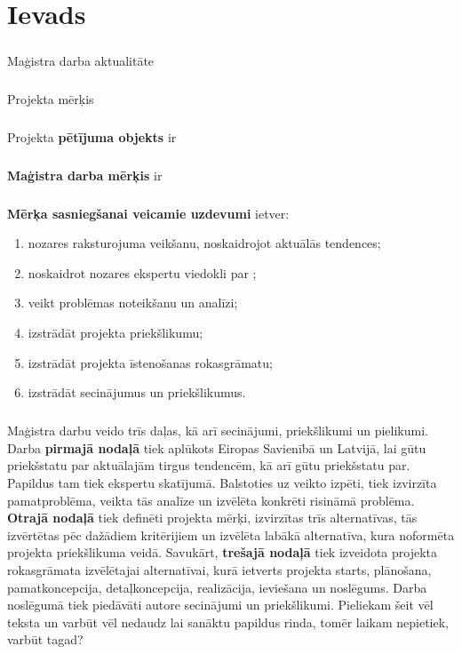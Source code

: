 \chapter*{Ievads} %
\paragraph{}
Maģistra darba aktualitāte
\paragraph{}
Projekta mērķis
\paragraph{}
Projekta \textbf{pētījuma objekts} ir 
\paragraph{}
\textbf{Maģistra darba mērķis} ir 
\paragraph{}
\textbf{Mērķa sasniegšanai veicamie uzdevumi} ietver:
\begin{enumerate}
    \item nozares raksturojuma veikšanu, noskaidrojot aktuālās tendences;
    \item noskaidrot nozares ekspertu viedokli par ;
    \item veikt problēmas noteikšanu un analīzi;
    \item izstrādāt projekta priekšlikumu;
    \item izstrādāt projekta īstenošanas rokasgrāmatu;
    \item izstrādāt secinājumus un priekšlikumus.
\end{enumerate}
\paragraph{}
Maģistra darbu veido trīs daļas, kā arī secinājumi, priekšlikumi un pielikumi.
Darba \textbf{pirmajā nodaļā} tiek aplūkots Eiropas Savienībā un Latvijā, lai gūtu priekšstatu par 
aktuālajām tirgus tendencēm, kā arī gūtu priekšstatu par. Papildus tam tiek ekspertu skatījumā. 
Balstoties uz veikto izpēti, tiek izvirzīta pamatproblēma, veikta tās analīze un izvēlēta konkrēti
risināmā problēma. 
\textbf{Otrajā nodaļā} tiek definēti projekta mērķi,
izvirzītas trīs alternatīvas, tās izvērtētas pēc dažādiem kritērijiem un izvēlēta labākā alternatīva, 
kura noformēta projekta priekšlikuma veidā. 
Savukārt, \textbf{trešajā nodaļā} tiek izveidota projekta
rokasgrāmata izvēlētajai alternatīvai, kurā ietverts projekta starts, plānošana, pamatkoncepcija,
detaļkoncepcija, realizācija, ieviešana un noslēgums. 
Darba noslēgumā tiek piedāvāti autore secinājumi un priekšlikumi. Pieliekam šeit vēl teksta un 
varbūt vēl nedaudz lai sanāktu papildus rinda, tomēr laikam nepietiek, varbūt tagad?
